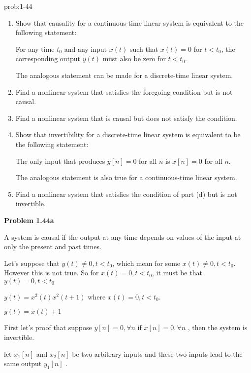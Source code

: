 \documentclass[koma,a4paper,utopia,12pt,listings-color,microtype,paralist,colorlinks,urlcolor=red]{org-article}
\begin{document}
\begin{prob}[]{prob:1-44}
\begin{enumerate}
\item Show that causality for a continuous-time linear system is equivalent to
the following statement:

For any time \(t_{0}\) and any input \(x(t)\) such that \(x(t) = 0\) for
\(t<t_{0}\), the corresponding output \(y(t)\) must also be zero for \(t<
       t_{0}\).

The analogous statement can be made for a discrete-time linear system.

\item Find a nonlinear system that satisfies the foregoing condition but is not
causal.

\item Find a nonlinear system that is causal but does not satisfy the
condition.

\item Show that invertibility for a discrete-time linear system is equivalent
to be the following statement:

The only input that produces \(y[n] = 0\) for all \(n\) is \(x[n]= 0\)
for all \(n\).

The analogous statement is also true for a continuous-time linear system.

\item Find a nonlinear system that satisfies the condition of part (d) but is
not invertible.
\end{enumerate}
\label{prob:1-44}
\end{prob}

\textbf{Problem 1.44a}

A system is causal if the output at any time depends on values of the input at
only the present and past times.

Let's suppose that \(y(t) \neq 0, t< t_{0}\), which mean for some \(x(t) \neq
0, t< t_{0}\). However this is not true. So for \(x(t) = 0, t< t_{0}\), it must
be that \(y(t)= 0 , t< t_{0}\)

\(y(t) = x^{2}(t)x^{2}(t+1)\) where \(x(t) = 0, t< t_{0}\).

\(y(t) = x(t) + 1\)

First let's proof that suppose  \(y[n] = 0, \forall n\) if \(x[n]=0 ,\forall n\)
, then the system is invertible.

let \(x_{1}[n]\) and \(x_{2}[n]\) be two arbitrary inputs and these two inputs
lead to the same output \(y_{1}[n]\) .
\end{document}

